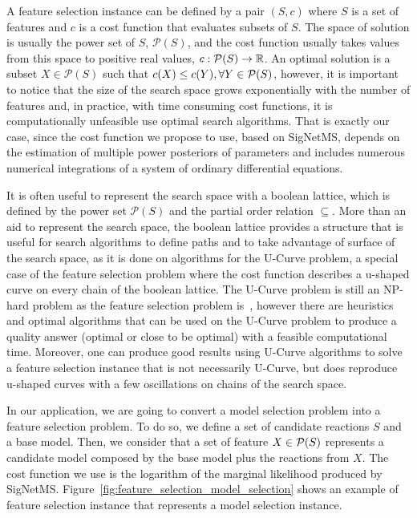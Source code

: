A feature selection instance can be defined by a pair $(S, c)$ where $S$
is a set of features and $c$ is a cost function that evaluates subsets
of $S$. The space of solution is usually the power set of $S$,
$\mathcal{P}(S)$, and the cost function usually takes values from this 
space to positive real values, $c: \mathcal{P}(S) \to \mathbb{R}$. An
optimal solution is a subset $X \in \mathcal{P}(S)$ such that $c(X) \leq
c(Y), \forall Y \in \mathcal{P} (S)$, however, it is important to notice
that the size of the search space grows exponentially with the number of
features and, in practice, with time consuming cost functions, it is
computationally unfeasible use optimal search algorithms. That is
exactly our case, since the cost function we propose to use, based on
SigNetMS, depends on the estimation of multiple power posteriors of
parameters and includes numerous numerical integrations of a system of
ordinary differential equations.

It is often useful to represent the search space with a boolean lattice, 
which is defined by the power set $\mathcal{P}(S)$ and the partial order 
relation $\subseteq$. More than an aid to represent the search space,
the boolean lattice provides a structure that is useful for search
algorithms to define paths and to take advantage of surface of the 
search space, as it is done on algorithms for the U-Curve problem, a 
special case of the feature selection problem where the cost function 
describes a u-shaped curve on every chain of the boolean lattice. The
U-Curve problem is still an NP-hard problem as the feature selection
problem is~\cite{Rei12}, however there are heuristics and optimal
algorithms that can be used on the U-Curve problem to produce a quality
answer (optimal or close to be optimal) with a feasible computational
time. Moreover, one can produce good results using U-Curve algorithms to 
solve a feature selection instance that is not necessarily U-Curve, but
does reproduce u-shaped curves with a few oscillations on chains of the
search space.

In our application, we are going to convert a model selection problem
into a feature selection problem. To do so, we define a set of candidate
reactions $S$ and a base model. Then, we consider that a set of feature
$X \in \mathcal{P} (S)$ represents a candidate model composed by the base
model plus the reactions from $X$. The cost function we use is the
logarithm of the marginal likelihood produced by SigNetMS.
Figure~\ref{fig:feature_selection_model_selection} shows an example of
feature selection instance that represents a model selection instance.

